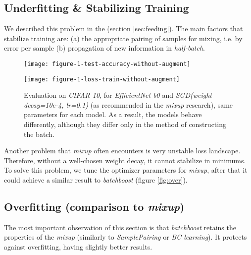 \documentclass{article}
\begin{document}
\subsection{Underfitting \& Stabilizing Training}
\label{sec:under}

We described this problem in the (section \ref{sec:feeding}). The main factors
that stabilize training are: (a) the appropriate pairing of samples for mixing,
i.e. by error per sample (b) propagation of new information in \emph{half-batch}.

\begin{figure}[H]
  \centering
\begin{minipage}{.3\textwidth}
  \hspace{-0.65cm}
  \texttt{[image: figure-1-test-accuracy-without-augment]}
\end{minipage}
\begin{minipage}{.65\textwidth}\vspace{-0.00cm}\hspace{0.865cm}
  \texttt{[image: figure-1-loss-train-without-augment]}
\end{minipage}\caption{Evaluation on \emph{CIFAR-10}, for \emph{EfficientNet-b0} and
	\emph{SGD(weight-decay=10e-4, lr=0.1)} (as
	recommended in the \emph{mixup} research), same parameters for each model.
	As a result, the models behave differently, although they differ only in the
	method of constructing the batch.}
\label{fig:under}
\end{figure}

Another problem that \emph{mixup} often encounters is very unstable loss
landscape. Therefore, without a well-chosen weight decay, it cannot stabilize in
minimums. To solve this problem, we tune the optimizer parameters
for \emph{mixup}, after that it could achieve a similar result to
\emph{batchboost} (figure \ref{fig:over}).

\subsection{Overfitting (comparison to \emph{mixup})}
\label{sec:over}

The most important observation of this section is that \emph{batchboost} retains
the properties of the \emph{mixup} (similarly to \emph{SamplePairing} or
\emph{BC learning}). It protects against overfitting, having slightly better results.
\end{document}
